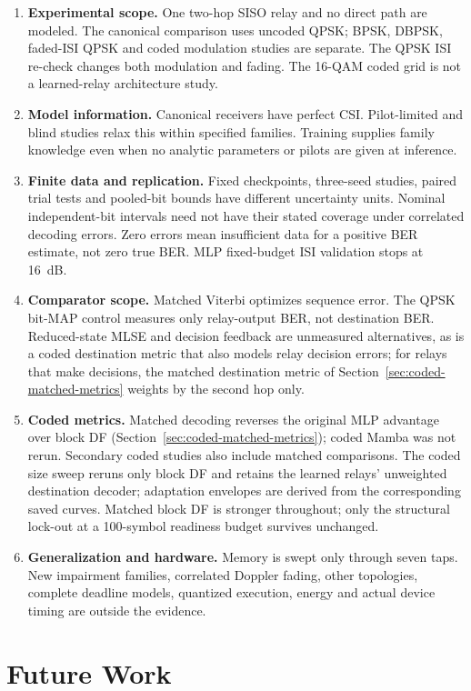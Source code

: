 \begin{enumerate}
\item \textbf{Experimental scope.} One two-hop SISO relay and no direct path are modeled. The canonical comparison uses uncoded QPSK; BPSK, DBPSK, faded-ISI QPSK and coded modulation studies are separate. The QPSK ISI re-check changes both modulation and fading. The 16-QAM coded grid is not a learned-relay architecture study.
\item \textbf{Model information.} Canonical receivers have perfect CSI. Pilot-limited and blind studies relax this within specified families. Training supplies family knowledge even when no analytic parameters or pilots are given at inference.
\item \textbf{Finite data and replication.} Fixed checkpoints, three-seed studies, paired trial tests and pooled-bit bounds have different uncertainty units. Nominal independent-bit intervals need not have their stated coverage under correlated decoding errors. Zero errors mean insufficient data for a positive BER estimate, not zero true BER. MLP fixed-budget ISI validation stops at 16~dB.
\item \textbf{Comparator scope.} Matched Viterbi optimizes sequence error. The QPSK bit-MAP control measures only relay-output BER, not destination BER. Reduced-state MLSE and decision feedback are unmeasured alternatives, as is a coded destination metric that also models relay decision errors; for relays that make decisions, the matched destination metric of Section~\ref{sec:coded-matched-metrics} weights by the second hop only.
\item \textbf{Coded metrics.} Matched decoding reverses the original MLP advantage over block DF (Section~\ref{sec:coded-matched-metrics}); coded Mamba was not rerun. Secondary coded studies also include matched comparisons. The coded size sweep reruns only block DF and retains the learned relays' unweighted destination decoder; adaptation envelopes are derived from the corresponding saved curves. Matched block DF is stronger throughout; only the structural lock-out at a 100-symbol readiness budget survives unchanged.
\item \textbf{Generalization and hardware.} Memory is swept only through seven taps. New impairment families, correlated Doppler fading, other topologies, complete deadline models, quantized execution, energy and actual device timing are outside the evidence.
\end{enumerate}

\section{Future Work}\label{sec:future-work}

